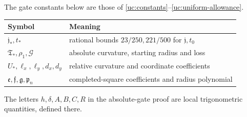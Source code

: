 The gate constants below are those of
\eqref{uc:constants}--\eqref{uc:uniform-allowance}.
\begin{center}\small
\begin{tabular}{@{}ll@{}}
\toprule Symbol & Meaning\\\midrule
$\mathfrak j_*,t_*$ & rational bounds $23/250,221/500$ for $\mathfrak j,t_0$\\
$\mathfrak T_*,\rho_1,\mathcal G$ & absolute curvature, starting radius and loss\\
$U_*,\ell_x,\ell_y,d_x,d_y$ & relative curvature and coordinate coefficients\\
$\mathfrak e,\mathfrak f,\mathfrak g,\mathfrak p_n$ & completed-square coefficients and radius polynomial\\
\bottomrule
\end{tabular}
\end{center}
The letters $h,\delta,A,B,C,R$ in the absolute-gate proof are local
trigonometric quantities, defined there.

